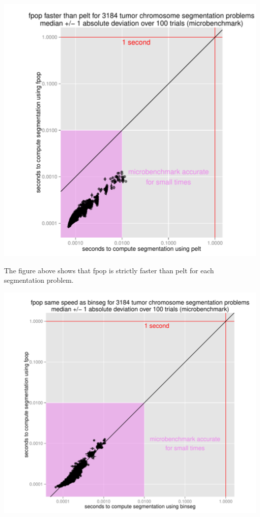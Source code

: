 \documentclass{article}
\begin{document}
\begin{center}
  \includegraphics[width=\textwidth]{figure-microbenchmark-arrays-fpop-pelt}
\end{center}

The figure above shows that fpop is strictly faster than pelt for each
segmentation problem.

\begin{center}
  \includegraphics[width=\textwidth]{figure-microbenchmark-arrays-fpop-binseg}
\end{center}
\end{document}
